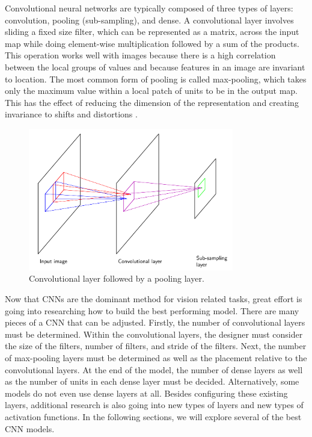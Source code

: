 Convolutional neural networks are typically composed of three types of layers: convolution, pooling (sub-sampling), and dense. A convolutional layer involves sliding a fixed size filter, which can be represented as a matrix, across the input map while doing element-wise multiplication followed by a sum of the products. This operation works well with images because there is a high correlation between the local groups of values and because features in an image are invariant to location. The most common form of pooling is called max-pooling, which takes only the maximum value within a local patch of units to be in the output map. This has the effect of reducing the dimension of the representation and creating invariance to shifts and distortions \cite{Nature_DL}.

\begin{figure}
    \centering
    \includegraphics[width=0.8\textwidth]{images/conv.png}
    \caption{Convolutional layer followed by a pooling layer. \cite{Bishop2007}}
    \label{conv}
\end{figure}

Now that CNNs are the dominant method for vision related tasks, great effort is going into researching how to build the best performing model. There are many pieces of a CNN that can be adjusted. Firstly, the number of convolutional layers must be determined. Within the convolutional layers, the designer must consider the size of the filters, number of filters, and stride of the filters. Next, the number of max-pooling layers must be determined as well as the placement relative to the convolutional layers. At the end of the model, the number of dense layers as well as the number of units in each dense layer must be decided. Alternatively, some models do not even use dense layers at all. Besides configuring these existing layers, additional research is also going into new types of layers and new types of activation functions. In the following sections, we will explore several of the best CNN models.


